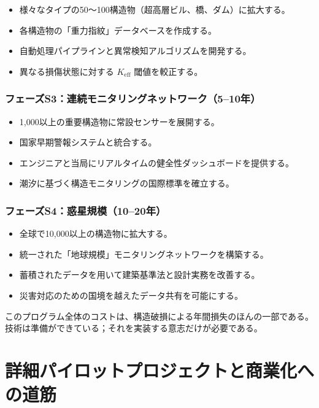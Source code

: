 \documentclass[12pt,a4paper]{article}
\theoremstyle{remark}
\begin{document}
	\begin{itemize}
		\item 様々なタイプの50～100構造物（超高層ビル、橋、ダム）に拡大する。
		\item 各構造物の「重力指紋」データベースを作成する。
		\item 自動処理パイプラインと異常検知アルゴリズムを開発する。
		\item 異なる損傷状態に対する \(K_{\mathrm{eff}}\) 閾値を較正する。
	\end{itemize}
	
	\subsubsection{フェーズS3：連続モニタリングネットワーク（5–10年）}
	
	\begin{itemize}
		\item 1,000以上の重要構造物に常設センサーを展開する。
		\item 国家早期警報システムと統合する。
		\item エンジニアと当局にリアルタイムの健全性ダッシュボードを提供する。
		\item 潮汐に基づく構造モニタリングの国際標準を確立する。
	\end{itemize}
	
	\subsubsection{フェーズS4：惑星規模（10–20年）}
	
	\begin{itemize}
		\item 全球で10,000以上の構造物に拡大する。
		\item 統一された「地球規模」モニタリングネットワークを構築する。
		\item 蓄積されたデータを用いて建築基準法と設計実務を改善する。
		\item 災害対応のための国境を越えたデータ共有を可能にする。
	\end{itemize}
	
	このプログラム全体のコストは、構造破損による年間損失のほんの一部である。技術は準備ができている；それを実装する意志だけが必要である。
	
	\section{詳細パイロットプロジェクトと商業化への道筋}
	
\end{document}
